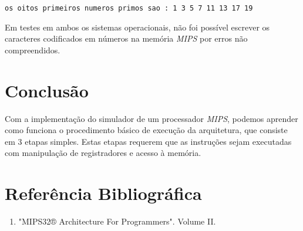 \documentclass[12pt, a4paper, twoside]{article}
\begin{document}
\begin{lstlisting}
os oitos primeiros numeros primos sao : 1 3 5 7 11 13 17 19
\end{lstlisting}

Em testes em ambos os sistemas operacionais, não foi possível escrever os
caracteres codificados em números na memória \textit{MIPS} por erros não
compreendidos.

\section{Conclusão}

Com a implementação do simulador de um processador \textit{MIPS}, podemos
aprender como funciona o procedimento básico de execução da arquitetura, que
consiste em 3 etapas simples. Estas etapas requerem que as instruções sejam
executadas com manipulação de registradores e acesso à memória.

\section{Referência Bibliográfica}

\begin{enumerate}
    \item "MIPS32® Architecture For Programmers". Volume II.
\end{enumerate}
\end{document}

